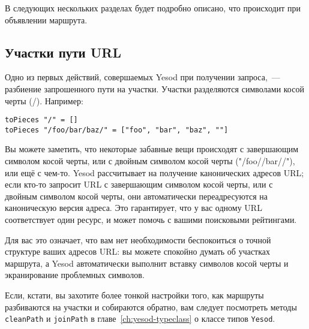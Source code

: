 В следующих нескольких разделах будет подробно описано, что происходит
при объявлении маршрута.

\subsection{Участки пути URL}
Одно из первых действий, совершаемых Yesod при получении запроса,~---
разбиение запрошенного пути на участки.  Участки разделяются символами
косой черты (/). Например:
\begin{lstlisting}
toPieces "/" = []
toPieces "/foo/bar/baz/" = ["foo", "bar", "baz", ""]
\end{lstlisting}

Вы можете заметить, что некоторые забавные вещи происходят с
завершающим символом косой черты, или с двойным символом косой черты
("/foo//bar//"), или ещё с чем-то. Yesod рассчитывает на получение
канонических адресов URL; если кто-то запросит URL с завершающим
символом косой черты, или с двойным символом косой черты, они
автоматически переадресуются на каноническую версия адреса. Это
гарантирует, что у вас одному URL соответствует один ресурс, и может
помочь с вашими поисковыми рейтингами.

Для вас это означает, что вам нет необходимости беспокоиться о точной
структуре ваших адресов URL: вы можете спокойно думать об участках
маршрута, а Yesod автоматически выполнит вставку символов косой черты
и экранирование проблемных символов.

Если, кстати, вы захотите более тонкой настройки того, как маршруты
разбиваются на участки и собираются обратно, вам следует посмотреть
методы \lstinline!cleanPath! и \lstinline!joinPath! в главе~\ref{ch:yesod-typeclass}
о классе типов \lstinline!Yesod!.

